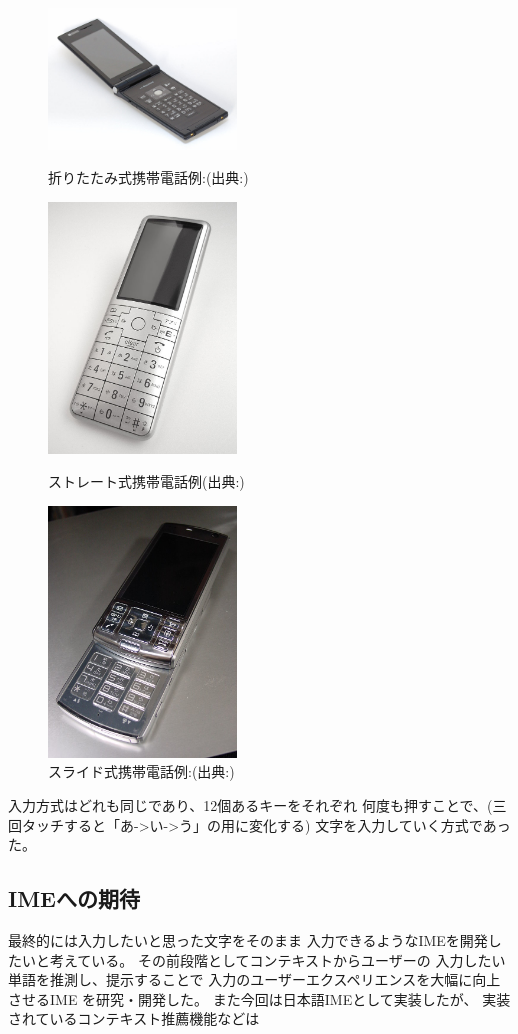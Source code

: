 \begin{figure}[htbp]
  \begin{minipage}{0.3\hsize}
    \begin{center}
      \includegraphics[width=50mm,bb=0 0 1024 768]{images/oritatami.png}
    \end{center}
    \caption{折りたたみ式携帯電話例:(出典:\cite{keitai})}
    \label{fig:oritatami}
  \end{minipage}
  \begin{minipage}{0.3\hsize}
    \begin{center}
      \includegraphics[width=50mm,bb=0 0 147 196]{images/straight.png}
    \end{center}
    \caption{ストレート式携帯電話例(出典:\cite{keitai})}
    \label{fig:straight}
  \end{minipage}
  \begin{minipage}{0.3\hsize}
    \begin{center}
      \includegraphics[width=50mm,bb=0 0 154 205]{images/slide.png}
    \end{center}
    \caption{スライド式携帯電話例:(出典:\cite{keitai})}
    \label{fig:slide}
  \end{minipage}
\end{figure}
入力方式はどれも同じであり、12個あるキーをそれぞれ
何度も押すことで、(三回タッチすると「あ->い->う」の用に変化する)
文字を入力していく方式であった。

\subsection{IMEへの期待}
最終的には入力したいと思った文字をそのまま
入力できるようなIMEを開発したいと考えている。
その前段階としてコンテキストからユーザーの
入力したい単語を推測し、提示することで
入力のユーザーエクスペリエンスを大幅に向上させるIME
を研究・開発した。
また今回は日本語IMEとして実装したが、
実装されているコンテキスト推薦機能などは
